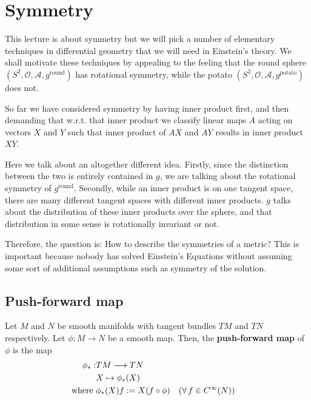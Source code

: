 \section{Symmetry}
\begin{framed}
This lecture is about symmetry but we will pick a number of elementary techniques in differential geometry that we will need in Einstein's theory. We shall motivate these techniques by appealing to the feeling that the round sphere $(S^2, \mathcal{O}, \mathcal{A},g^{\text{round}})$ has rotational symmetry, while the potato $(S^2, \mathcal{O},\mathcal{A}, g^{\text{potato}})$ does not.

So far we have considered symmetry by having inner product first, and then demanding that w.r.t. that inner product we classify linear maps $A$ acting on vectors $X$ and $Y$ such that inner product of $AX$ and $AY$ results in inner product $XY$.

Here we talk about an altogether different idea. Firstly, since the distinction between the two is entirely contained in $g$, we are talking about the rotational symmetry of $g^{\text{round}}$. Secondly, while an inner product is on one tangent space, there are many different tangent spaces with different inner products. $g$ talks about the distribution of these inner products over the sphere, and that distribution in some sense is rotationally invariant or not.

Therefore, the question is: How to describe the symmetries of a metric? This is important because nobody has solved Einstein's Equations without assuming some sort of additional assumptions such as symmetry of the solution.
\end{framed}

\subsection{Push-forward map}
\begin{definition}
Let $M$ and $N$ be smooth manifolds with tangent bundles $TM$ and $TN$ respectively. Let $\phi : M \to N$ be a smooth map. Then, the \textbf{push-forward map} of $\phi$ is the map
\begin{align}
\phi_{\ast} : & TM \longrightarrow TN \nonumber \\
& X \mapsto \phi_\ast(X) \nonumber \\
\label{eq_defPushForwardMap}\text{where } & \phi_\ast(X) f := X (f \circ \phi) && (\forall \, f \in C^\infty(N))
\end{align}
\end{definition}


